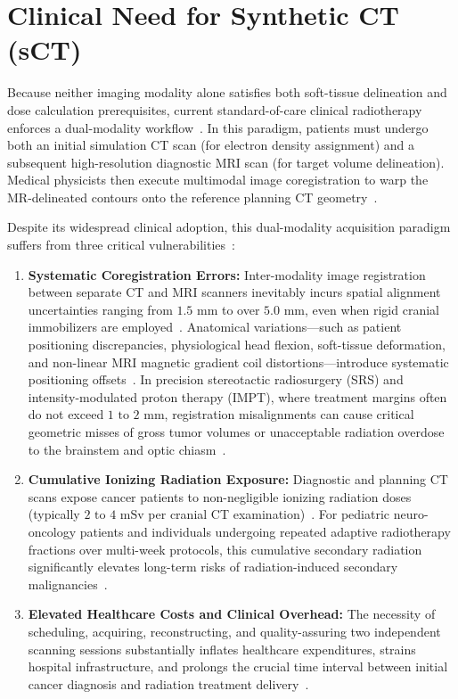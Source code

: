 \section{Clinical Need for Synthetic CT (sCT)}
Because neither imaging modality alone satisfies both soft-tissue delineation and dose calculation prerequisites, current standard-of-care clinical radiotherapy enforces a dual-modality workflow~\cite{edmund2017review,siversson2015mri}. In this paradigm, patients must undergo both an initial simulation CT scan (for electron density assignment) and a subsequent high-resolution diagnostic MRI scan (for target volume delineation). Medical physicists then execute multimodal image coregistration to warp the MR-delineated contours onto the reference planning CT geometry~\cite{edmund2017review}.

Despite its widespread clinical adoption, this dual-modality acquisition paradigm suffers from three critical vulnerabilities~\cite{edmund2017review,korsholm2018clinical,siversson2015mri}:
\begin{enumerate}[label=\textbf{(\arabic*)}]
    \item \textbf{Systematic Coregistration Errors:} Inter-modality image registration between separate CT and MRI scanners inevitably incurs spatial alignment uncertainties ranging from $1.5\text{ mm}$ to over $5.0\text{ mm}$, even when rigid cranial immobilizers are employed~\cite{edmund2017review,korsholm2018clinical}. Anatomical variations—such as patient positioning discrepancies, physiological head flexion, soft-tissue deformation, and non-linear MRI magnetic gradient coil distortions—introduce systematic positioning offsets~\cite{edmund2017review}. In precision stereotactic radiosurgery (SRS) and intensity-modulated proton therapy (IMPT), where treatment margins often do not exceed $1\text{ to }2\text{ mm}$, registration misalignments can cause critical geometric misses of gross tumor volumes or unacceptable radiation overdose to the brainstem and optic chiasm~\cite{siversson2015mri}.
    \item \textbf{Cumulative Ionizing Radiation Exposure:} Diagnostic and planning CT scans expose cancer patients to non-negligible ionizing radiation doses (typically $2\text{ to }4\text{ mSv}$ per cranial CT examination)~\cite{edmund2017review}. For pediatric neuro-oncology patients and individuals undergoing repeated adaptive radiotherapy fractions over multi-week protocols, this cumulative secondary radiation significantly elevates long-term risks of radiation-induced secondary malignancies~\cite{edmund2017review,thummerer2023synthrad2023}.
    \item \textbf{Elevated Healthcare Costs and Clinical Overhead:} The necessity of scheduling, acquiring, reconstructing, and quality-assuring two independent scanning sessions substantially inflates healthcare expenditures, strains hospital infrastructure, and prolongs the crucial time interval between initial cancer diagnosis and radiation treatment delivery~\cite{edmund2017review,siversson2015mri}.
\end{enumerate}


